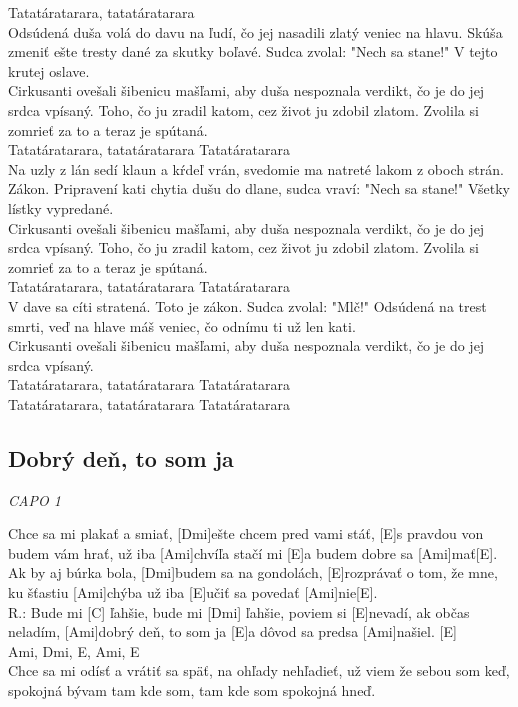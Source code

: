 \documentclass[10pt]{article}
\begin{document}
\begin{Large}
\begin{minipage}{\textwidth}
\begin{multicols}{2}
\begin{guitar}
	Tatatáratarara, tatatáratarara
	\\
	Odsúdená duša volá do davu
	na ľudí, čo jej nasadili zlatý veniec na hlavu.
	Skúša zmeniť ešte tresty dané za skutky boľavé.
	Sudca zvolal: "Nech sa stane!"
	V tejto krutej oslave.
	\\
	Cirkusanti ovešali šibenicu mašľami,
	aby duša nespoznala verdikt,
	čo je do jej srdca vpísaný.
	Toho, čo ju zradil katom,
	cez život ju zdobil zlatom.
	Zvolila si zomrieť za to a teraz je spútaná.
	\\
	Tatatáratarara, tatatáratarara
	Tatatáratarara
	\\
	Na uzly z lán sedí klaun a kŕdeľ vrán,
	svedomie ma natreté lakom z oboch strán.
	Zákon. Pripravení kati chytia dušu do dlane,
	sudca vraví: "Nech sa stane!"
	Všetky lístky vypredané.
	\\
	Cirkusanti ovešali šibenicu mašľami,
	aby duša nespoznala verdikt,
	čo je do jej srdca vpísaný.
	Toho, čo ju zradil katom,
	cez život ju zdobil zlatom.
	Zvolila si zomrieť za to a teraz je spútaná.
	\\
	Tatatáratarara, tatatáratarara
	Tatatáratarara
	\\
	V dave sa cíti stratená.
	Toto je zákon.
	Sudca zvolal: "Mlč!"
	Odsúdená na trest smrti,
	veď na hlave máš veniec,
	čo odnímu ti už len kati.
	\\
	Cirkusanti ovešali šibenicu mašľami,
	aby duša nespoznala verdikt,
	čo je do jej srdca vpísaný.
	\\
	Tatatáratarara, tatatáratarara
	Tatatáratarara
	\\
	Tatatáratarara, tatatáratarara
	Tatatáratarara
\end{guitar}
\end{multicols}
\end{minipage}


\begin{minipage}{\textwidth}
\subsection{Dobrý deň, to som ja}
\textit{CAPO 1}
\begin{multicols}{2}
\begin{guitar}
	[Ami]Chce sa mi plakať a smiať,
	[Dmi]ešte chcem pred vami stáť,
	[E]s pravdou von budem vám hrať,
	už iba [Ami]chvíľa stačí mi [E]a budem dobre sa [Ami]mať[E].
	\\
	[Ami]Ak by aj búrka bola,
	[Dmi]budem sa na gondolách,
	[E]rozprávať o tom, že mne,
	ku šťastiu [Ami]chýba už iba [E]učiť sa povedať [Ami]nie[E].
	\\
	R.:
	Bude mi [C] ľahšie, bude mi [Dmi] ľahšie,
	poviem si [E]nevadí, ak občas neladím,
	[Ami]dobrý deň, to som ja 
	[E]a dôvod sa predsa [Ami]našiel. [E]
	\\
	Ami, Dmi, E, Ami, E
	\\
	Chce sa mi odísť a vrátiť sa späť,
	na ohľady nehľadieť,
	už viem že sebou som keď,
	spokojná bývam tam kde som,
	 tam kde som spokojná hneď.
	

\end{guitar}
\end{multicols}
\end{minipage}
\end{Large}
\end{document}
